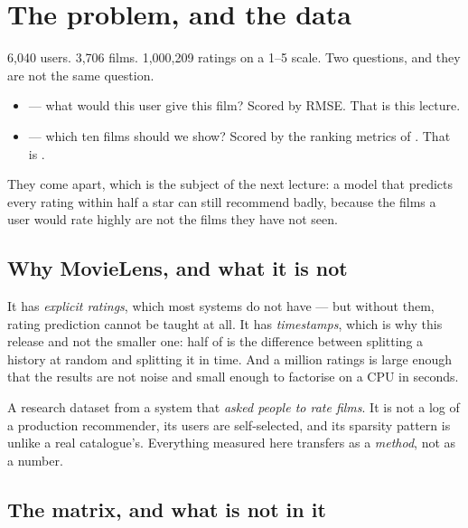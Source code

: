 \documentclass[11pt,a4paper]{article}
\begin{document}

\section{The problem, and the data}

6{,}040 users. 3{,}706 films. 1{,}000{,}209 ratings on a 1--5 scale. Two
questions, and they are not the same question.

\begin{itemize}[leftmargin=*,nosep]
  \item {} --- what would this user give this film?
        Scored by RMSE. That is this lecture.
  \item {} --- which ten films should we show?
        Scored by the ranking metrics of . That is .
\end{itemize}

They come apart, which is the subject of the next lecture: a model that
predicts every rating within half a star can still recommend badly, because the
films a user would rate highly are not the films they have not seen.

\subsection{Why MovieLens, and what it is not}

It has \emph{explicit ratings}, which most systems do not have --- but without
them, rating prediction cannot be taught at all. It has \emph{timestamps},
which is why this release and not the smaller one: half of  is the
difference between splitting a history at random and splitting it in time. And
a million ratings is large enough that the results are not noise and small
enough to factorise on a CPU in seconds.

\begin{keybox}[title={And what it is not}]
A research dataset from a system that \emph{asked people to rate films}. It is
not a log of a production recommender, its users are self-selected, and its
sparsity pattern is unlike a real catalogue's. Everything measured here
transfers as a \emph{method}, not as a number.
\end{keybox}

\subsection{The matrix, and what is not in it}
\end{document}
